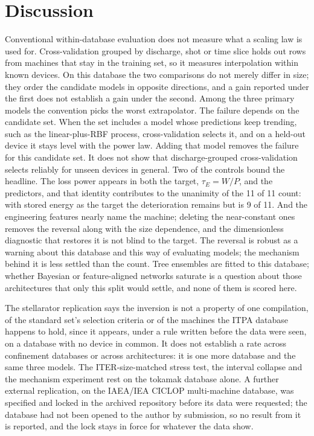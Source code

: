 \documentclass[aip,pop,preprint,amsmath,amssymb]{revtex4-2}
\begin{document}
\section{Discussion}
\label{sec:discussion}

Conventional within-database evaluation does not measure what a scaling law is
used for. Cross-validation grouped by discharge, shot or time slice holds out
rows from machines that stay in the training set, so it measures interpolation
within known devices. On this database the two comparisons do not merely differ
in size; they order the candidate models in opposite directions, and a gain
reported under the first does not establish a gain under the second. Among the
three primary models the convention picks the worst extrapolator. The failure
depends on the candidate set. When the set includes a model whose predictions
keep trending, such as the linear-plus-RBF process, cross-validation selects
it, and on a held-out device it stays level with the power law. Adding that
model removes the failure for this candidate set. It does not show that
discharge-grouped cross-validation selects reliably for unseen devices in
general. Two of the controls bound the headline. The loss power appears in
both the target, $\tau_E=W/P$, and the predictors, and that identity
contributes to the unanimity of the 11 of 11 count: with stored energy as the
target the deterioration remains but is 9 of 11. And the engineering features
nearly name the machine; deleting the near-constant ones removes the reversal
along with the size dependence, and the dimensionless diagnostic that restores
it is not blind to the target. The reversal is robust as a warning about this
database and this way of evaluating models; the mechanism behind it is less
settled than the count. Tree ensembles are fitted
to this database\cite{xiong}; whether Bayesian\cite{gao} or
feature-aligned\cite{namseo} networks saturate is a question about those
architectures that only this split would settle, and none of them is scored
here.

The stellarator replication says the inversion is not a property of one
compilation, of the standard set's selection criteria or of the machines the
ITPA database happens to hold, since it appears, under a rule written before the
data were seen, on a database with no device in common. It does not establish a
rate across confinement databases or across architectures: it is one more
database and the same three models. The ITER-size-matched stress test, the
interval collapse and the mechanism experiment rest on the tokamak database
alone.
A further external replication, on the IAEA/IEA CICLOP multi-machine
database\cite{litaudon24,litaudon26}, was specified and locked in the archived
repository before its data were requested; the database had not been opened to
the author by submission, so no result from it is reported, and the lock stays
in force for whatever the data show.
\end{document}
